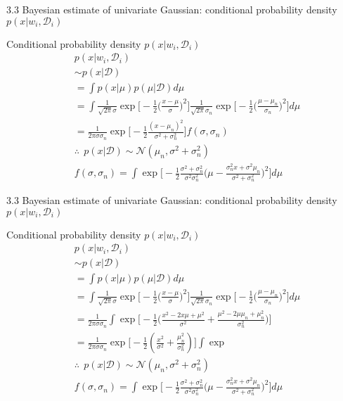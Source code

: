 \documentclass[compress,blue]{beamer}
\newcommand{\calD}{\mathcal{D}}
\begin{document}
\begin{frame}{3.3 Bayesian estimate of univariate Gaussian: conditional probability density $p(x | w_i, \calD_i)$}
	\begin{block}{Conditional probability density $p(x | w_i, \calD_i)$}
		\small
		\begin{align}
			& p(x|w_i, \calD_i) \\
			&\sim p(x | \calD) \\
			& = \int p(x|\mu) p(\mu | \calD) d\mu \\
			& = \int \frac{1}{\sqrt{2\pi}\sigma}\exp\Big[-\frac{1}{2}\Big(\frac{x-\mu}{\sigma}\Big)^2\Big]\frac{1}{\sqrt{2\pi}\sigma_n}\exp\Big[-\frac{1}{2}\Big(\frac{\mu-\mu_n}{\sigma_n}\Big)^2\Big]d\mu \nonumber\\
			& = \frac{1}{2\pi\sigma\sigma_n}\exp\Big[-\frac{1}{2}\frac{(x-\mu_n)^2}{\sigma^2+\sigma^2_n}\Big]f(\sigma, \sigma_n)\\
			& \therefore ~~ p(x | \calD) \sim \mathcal{N}(\mu_n, \sigma^2+\sigma^2_n)\\
			& f(\sigma, \sigma_n) = \int \exp\Big[-\frac{1}{2}\frac{\sigma^2 + \sigma_n^2}{\sigma^2\sigma_n^2}\Big(\mu - \frac{\sigma^2_n x + \sigma^2\mu_n}{\sigma^2 + \sigma^2_n}\Big)^2\Big]d\mu
		\end{align}
		\normalsize
	\end{block}
\end{frame}

\begin{frame}{3.3 Bayesian estimate of univariate Gaussian: conditional probability density $p(x | w_i, \calD_i)$}
	\begin{block}{Conditional probability density $p(x | w_i, \calD_i)$}
		\tiny
		\begin{align}
			& p(x|w_i, \calD_i) \\
			&\sim p(x | \calD) \\
			& = \int p(x|\mu) p(\mu | \calD) d\mu \\
			& = \int \frac{1}{\sqrt{2\pi}\sigma}\exp\Big[-\frac{1}{2}\Big(\frac{x-\mu}{\sigma}\Big)^2\Big]\frac{1}{\sqrt{2\pi}\sigma_n}\exp\Big[-\frac{1}{2}\Big(\frac{\mu-\mu_n}{\sigma_n}\Big)^2\Big]d\mu \nonumber\\
			& =\frac{1}{2\pi\sigma\sigma_n}\int\exp\Big[-\frac{1}{2}\Big(\frac{x^2-2x\mu+\mu^2}{\sigma^2} + \frac{\mu^2-2\mu\mu_n + \mu_n^2}{\sigma_n^2}\Big)\Big]\\
			& =\frac{1}{2\pi\sigma\sigma_n}\exp\Big[-\frac{1}{2}(\frac{x^2}{\sigma^2}+\frac{\mu_n^2}{\sigma_n^2})\Big]\int\exp\\
			& \therefore ~~ p(x | \calD) \sim \mathcal{N}(\mu_n, \sigma^2+\sigma^2_n)\\
			& f(\sigma, \sigma_n) = \int \exp\Big[-\frac{1}{2}\frac{\sigma^2 + \sigma_n^2}{\sigma^2\sigma_n^2}\Big(\mu - \frac{\sigma^2_n x + \sigma^2\mu_n}{\sigma^2 + \sigma^2_n}\Big)^2\Big]d\mu
		\end{align}
		\normalsize
	\end{block}
\end{frame}
\end{document}

